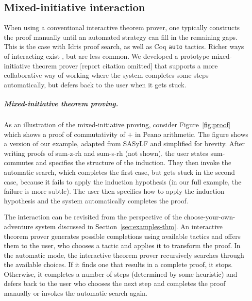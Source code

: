 \documentclass[ a4paper,UKenglish,cleveref, autoref, thm-restate]{lipics-v2021}
\newcommand{\ident}[1]{\textsf{#1}}
\begin{document}
\subsection{Mixed-initiative interaction}
When using a conventional interactive theorem prover, one typically constructs the proof manually until an
automated strategy can fill in the remaining gaps. This is the case with Idris proof search,
as well as Coq \texttt{auto} tactics. Richer ways of interacting exist \cite{lowe-1997-xbarnacle},
but are less common. We developed a prototype mixed-initiative theorem prover [report citation
omitted] that supports a more collaborative way of working where the system completes some
steps automatically, but defers back to the user when it gets stuck.

\subparagraph{Mixed-initiative theorem proving.}
As an illustration of the mixed-initiative proving, consider Figure~\ref{fig:proof} which
shows a proof of commutativity of $+$ in Peano arithmetic. The figure shows a version of our example,
adapted from SASyLF \cite{aldrich-2008-sasylf,aldrich-2025-sum} and simplified for brevity.
After writing proofs of \ident{sum-z-rh} and \ident{sum-s-rh} (not shown), the user states
\ident{sum-commutes} and specifies the structure of the induction. They then invoke the automatic
search, which completes the first case, but gets stuck in the second case, because it fails
to apply the induction hypothesis (in our full example, the failure is more subtle). The user
then specifies how to apply the induction hypothesis and the system automatically completes the
proof.

The interaction can be revisited from the perspective of the choose-your-own-adventure system
discussed in Section~\ref{sec:examples-thm}. An interactive theorem prover generates possible
completions using available tactics and offers them to the user, who chooses a tactic and
applies it to transform the proof. In the automatic mode, the interactive theorem prover
recursively searches through the available choices. If it finds one that results in a complete
proof, it stops. Otherwise, it completes a number of steps (determined by some heuristic)
and defers back to the user who chooses the next step and completes the proof manually or
invokes the automatic search again.
\end{document}
